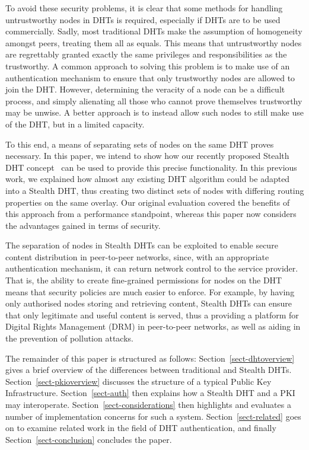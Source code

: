 \documentclass[times, 10pt,twocolumn]{article}
\begin{document}
To avoid these security problems, it is clear that some methods for
handling untrustworthy nodes in DHTs is required, especially if DHTs
are to be used commercially. Sadly, most traditional DHTs make the
assumption of homogeneity amongst peers, treating them all as equals.
This means that untrustworthy nodes are regrettably granted exactly the
same privileges and responsibilities as the trustworthy. A common
approach to solving this problem is to make use of an authentication
mechanism to ensure that only trustworthy nodes are allowed to join the
DHT. However, determining the veracity of a node can be a difficult
process, and simply alienating all those who cannot prove themselves
trustworthy may be unwise. A better approach is to instead allow such
nodes to still make use of the DHT, but in a limited capacity.

To this end, a means of separating sets of nodes on the same DHT proves
necessary. In this paper, we intend to show how our recently proposed
Stealth DHT concept~\cite{Brampton05Stealth} can be used to provide
this precise functionality. In this previous work, we explained how
almost any existing DHT algorithm could be adapted into a Stealth DHT,
thus creating two distinct sets of nodes with differing routing
properties on the same overlay. Our original evaluation covered the
benefits of this approach from a performance standpoint, whereas this
paper now considers the advantages gained in terms of security.

The separation of nodes in Stealth DHTs can be exploited to enable
secure content distribution in peer-to-peer networks, since, with an
appropriate authentication mechanism, it can return network control to
the service provider. That is, the ability to create fine-grained
permissions for nodes on the DHT means that security policies are much
easier to enforce. For example, by having only authorised nodes storing
and retrieving content, Stealth DHTs can ensure that only legitimate
and useful content is served, thus a providing a platform for Digital
Rights Management (DRM) in peer-to-peer networks, as well as aiding in
the prevention of pollution attacks.

The remainder of this paper is structured as follows:
Section~\ref{sect-dhtoverview} gives a brief overview of the
differences between traditional and Stealth DHTs.
Section~\ref{sect-pkioverview} discusses the structure of a typical
Public Key Infrastructure. Section~\ref{sect-auth} then explains how a
Stealth DHT and a PKI may interoperate.
Section~\ref{sect-considerations} then highlights and evaluates a
number of implementation concerns for such a system.
Section~\ref{sect-related} goes on to examine related work in the field
of DHT authentication, and finally Section~\ref{sect-conclusion}
concludes the paper.
\end{document}
